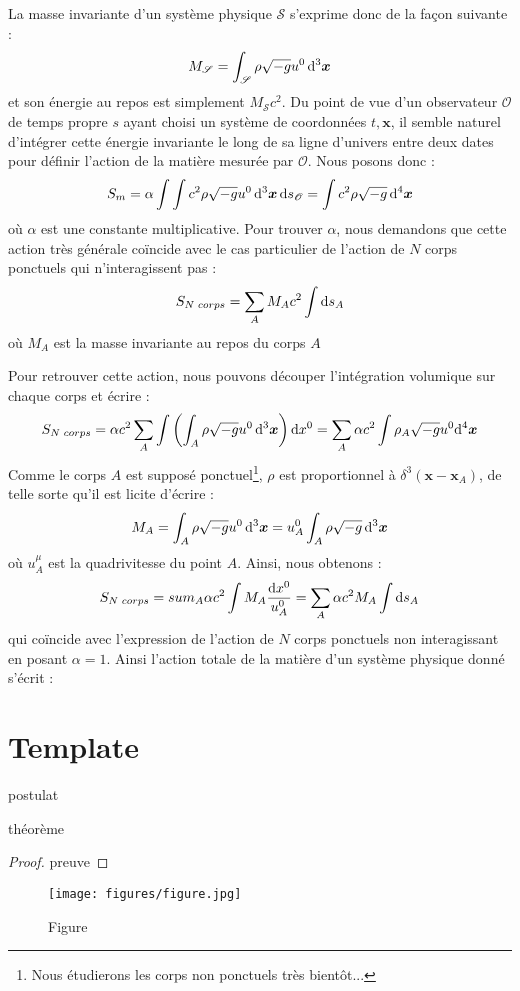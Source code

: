			La masse invariante d'un système physique $\mathscr{S}$ s'exprime donc de la façon suivante :
			\begin{equation}
				M_{\mathscr{S}}=\int_{\mathscr{S}} \rho \sqrt{-g} u^0 \, \mathrm{d}^3\bm{x} 
			\end{equation}
			et son énergie au repos est simplement $M_\mathscr{S}c^2$. Du point de vue d'un observateur $\mathscr{O}$ de temps propre $s$ ayant choisi un système de coordonnées $t,\bm{x}$, il semble naturel d'intégrer cette énergie invariante le long de sa ligne d'univers entre deux dates pour définir l'action de la matière mesurée par $\mathscr{O}$. Nous posons donc :
			\begin{equation}
				S_m = \alpha \int \int c^2 \rho \sqrt{-g} u^0 \, \mathrm{d}^3\bm{x} \, \mathrm{d} s_\mathscr{O} = \int c^2 \rho \sqrt{-g} \, \mathrm{d}^4\bm{x} 
			\end{equation}
			où $\alpha$ est une constante multiplicative. Pour trouver $\alpha$, nous demandons que cette action très générale coïncide avec le cas particulier de l'action de $N$ corps ponctuels qui n'interagissent pas :
			\begin{equation}
				S_{N\phantom{l}corps}=\sum_A M_A c^2 \int \mathrm{d} s_A
			\end{equation}
			où $M_A$ est la masse invariante au repos du corps $A$

			Pour retrouver cette action, nous pouvons découper l'intégration volumique sur chaque corps et écrire :
			\begin{equation}
				S_{N\phantom{l}corps}= \alpha c^2 \sum_A \int \left( \int_A \rho \sqrt{-g} u^0 \, \mathrm{d}^3\bm{x} \right) \mathrm{d} x^0 = \sum_A \alpha c^2 \int \rho_A \sqrt{-g} u^0 \mathrm{d}^4\bm{x}
			\end{equation}
			Comme le corps $A$ est supposé ponctuel\footnote{Nous étudierons les corps non ponctuels très bientôt...}, $\rho$ est proportionnel à $\delta^3(\bm{x}-\bm{x}_A)$, de telle sorte qu'il est licite d'écrire :
			\begin{equation}
				M_A = \int_A \rho \sqrt{-g} u^0 \, \mathrm{d}^3\bm{x} = u^0_A \int_A \rho \sqrt{-g} \, \mathrm{d}^3\bm{x} 
			\end{equation}
			où $u^\mu_A$ est la quadrivitesse du point $A$. Ainsi, nous obtenons :
			\begin{equation}
				S_{N\phantom{l}corps}=sum_A \alpha c^2 \int M_A \frac{\mathrm{d} x^0}{u^0_A} = \sum_A \alpha c^2 M_A \int \mathrm{d} s_A
			\end{equation}
			qui coïncide avec l'expression de l'action de $N$ corps ponctuels non interagissant en posant $\alpha=1$.
			Ainsi l'action totale de la matière d'un système physique donné s'écrit :


	\section{Template}
		\begin{post}
			postulat
		\end{post}
		\begin{theorem}
			théorème
		\end{theorem}

		\begin{proof}
			preuve
			\end{proof}


		\begin{figure}
			\centering
			\texttt{[image: figures/figure.jpg]}
			\caption{Figure}
		\label{fig}
		\end{figure}
